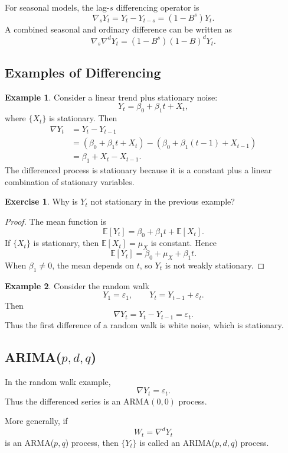 \documentclass[12pt,oneside]{book}
\numberwithin{equation}{section}
\theoremstyle{definition}
\newtheorem{example}{Example}[section]
\newtheorem{exercise}{Exercise}[section]
\theoremstyle{plain}
\theoremstyle{remark}
\newcommand{\E}{\mathbb{E}}
\begin{document}
For seasonal models, the lag-$s$ differencing operator is
\[
\nabla_sY_t
=
Y_t-Y_{t-s}
=
(1-B^s)Y_t.
\]
A combined seasonal and ordinary difference can be written as
\[
\nabla_s\nabla^dY_t
=
(1-B^s)(1-B)^dY_t.
\]

\subsection*{Examples of Differencing}

\begin{example}
Consider a linear trend plus stationary noise:
\[
Y_t=\beta_0+\beta_1t+X_t,
\]
where $\{X_t\}$ is stationary. Then
\begin{align*}
\nabla Y_t
&=
Y_t-Y_{t-1} \\
&=
(\beta_0+\beta_1t+X_t)
-
(\beta_0+\beta_1(t-1)+X_{t-1}) \\
&=
\beta_1+X_t-X_{t-1}.
\end{align*}
The differenced process is stationary because it is a constant plus a linear combination of stationary variables.
\end{example}

\begin{exercise}
Why is $Y_t$ not stationary in the previous example?
\end{exercise}

\begin{proof}
The mean function is
\[
\E[Y_t]
=
\beta_0+\beta_1t+\E[X_t].
\]
If $\{X_t\}$ is stationary, then $\E[X_t]=\mu_X$ is constant. Hence
\[
\E[Y_t]
=
\beta_0+\mu_X+\beta_1t.
\]
When $\beta_1\neq 0$, the mean depends on $t$, so $Y_t$ is not weakly stationary.
\end{proof}

\begin{example}
Consider the random walk
\[
Y_1=\varepsilon_1,
\qquad
Y_t=Y_{t-1}+\varepsilon_t.
\]
Then
\[
\nabla Y_t
=
Y_t-Y_{t-1}
=
\varepsilon_t.
\]
Thus the first difference of a random walk is white noise, which is stationary.
\end{example}

\subsection{ARIMA($p,d,q$)}

In the random walk example,
\[
\nabla Y_t=\varepsilon_t.
\]
Thus the differenced series is an ARMA$(0,0)$ process.

More generally, if
\[
W_t=\nabla^dY_t
\]
is an ARMA($p,q$) process, then $\{Y_t\}$ is called an ARIMA($p,d,q$) process.
\end{document}
